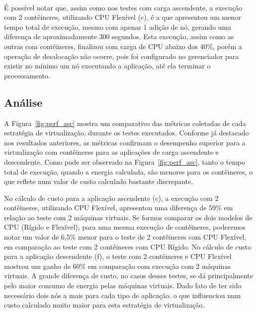 \documentclass[twoside,english,brazilian]{UNISINOSartigo}
\begin{document}
\begin{figure}[ht!]
\vspace{-0.4\baselineskip}
\\

\label{fig:trend_des}
\end{figure}


É possível notar que, assim como nos testes com carga ascendente, a execução com 2 contêineres, utilizando CPU Flexível (c), é a que apresentou um menor tempo total de execução, mesmo com apenas 1 adição de nó, gerando uma diferença de aproximadamente 300 segundos. Esta execução, assim como as outras com contêineres, finalizou com carga de CPU abaixo dos 40\%, porém a operação de desalocação não ocorre, pois foi configurado no gerenciador para existir no mínimo um nó executando a aplicação, até ela terminar o processamento.


\subsection{Análise}
A Figura~\ref{fig:perf_asc} mostra um comparativo das métricas coletadas de cada estratégia de virtualização, durante os testes executados. Conforme já destacado nos resultados anteriores, as métricas confirmam o desempenho superior para a virtualização com contêineres para as aplicações de carga ascendente e descendente. Como pode ser observado na Figura~\ref{fig:perf_asc}, tanto o tempo total de execução, quando a energia calculada, são menores para os contêineres, o que reflete num valor de custo calculado bastante discrepante. 

No cálculo de custo para a aplicação ascendente (c), a execução com 2 contêineres, utilizando CPU Flexível, apresentou uma diferença de 59\% em relação ao teste com 2 máquinas virtuais. Se formos comparar os dois modelos de CPU (Rígido e Flexível), para uma mesma execução de contêineres, poderemos notar um valor de 6,5\% menor para o teste de 2 contêineres com CPU Flexível, em comparação ao teste com 2 contêineres com CPU Rígido. No cálculo de custo para a aplicação descendente (f), o teste com 2 contêineres e CPU Flexível mostrou um ganho de 60\% em comparação com execução com 2 máquinas virtuais. A grande diferença de custo, no casos desses testes, se dá principalmente pelo maior consumo de energia pelas máquinas virtuais. Dado fato de ter sido necessário dois nós a mais para cada tipo de aplicação, o que influenciou num custo calculado muito maior para esta estratégia de virtualização. 
\end{document}
